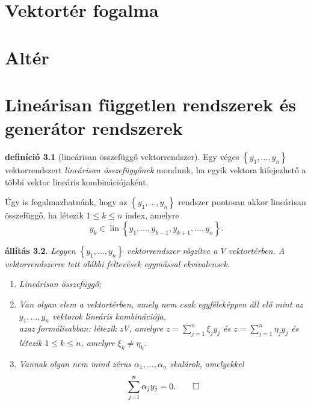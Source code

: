 \documentclass[9pt,showtrims]{memoir}
\theoremstyle{plain}
\newtheorem{proposition}{állítás}[section]
\theoremstyle{remark}
\theoremstyle{definition}
\newtheorem{definition}[proposition]{definíció}
\DeclareMathOperator{\lin}{lin}
\begin{document}
\chapter{Vektortér fogalma}
\chapter{Altér}
\chapter{Lineárisan független rendszerek és generátor rendszerek}
\begin{definition}[lineárisan összefüggő vektorrendszer]
    Egy véges $\left\{ y_1,\dots,y_n \right\}$ vektorrendszert \emph{lineárisan összefüggőnek}
    mondunk, ha egyik vektora kifejezhető a többi vektor lineáris kombinációjaként.
\end{definition}
Úgy is fogalmazhatnánk, hogy az $\left\{ y_1,\dots,y_n \right\}$ rendszer pontosan akkor
lineárisan összefüggő, ha létezik $1\leq k\leq n$ index, amelyre
\[
    y_k\in\lin\left\{ y_1,\dots,y_{k-1},y_{k+1},\dots,y_n \right\}.
\]
\begin{proposition}
    Legyen $\left\{ y_1,\dots,y_n \right\}$ vektorrendszer rögzítve a $V$ vektortérben.
    A vektorrendszerre tett alábbi feltevések egymással ekvivalensek.
    \begin{enumerate}
        \item Lineárisan összefüggő;
        \item Van olyan elem a vektortérben, amely nem csak egyféleképpen áll elő mint az $y_1,\dots,y_n$
            vektorok lineáris kombinációja,\\
            azaz formálisabban:
            létezik z\in V, amelyre $z=\sum_{j=1}^n\xi_jy_j$ és $z=\sum_{j=1}^n\eta_jy_j$
            és létezik $1\leq k\leq n$, amelyre $\xi_k\neq\eta_k$.
        \item Vannak olyan nem mind zérus $\alpha_1,\dots,\alpha_n$ skalárok, amelyekkel
            \[
                \sum_{j=1}^n\alpha_jy_j=0.\qedhere
            \]
    \end{enumerate}
\end{proposition}
\end{document}
